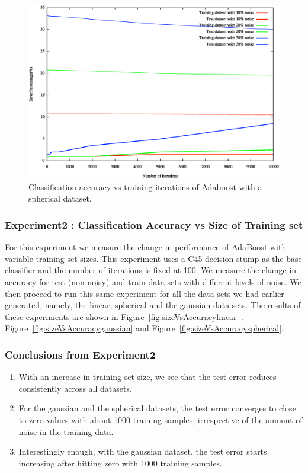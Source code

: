 \documentclass[letterpaper,11pt]{article}
\begin{document}
\begin{figure}[H]
  \centering
  \includegraphics[width=140mm]{iterVsAccuracy-spherical.eps}
  \caption{Classification accuracy vs training iterations of Adaboost with a spherical dataset.}
  \label{fig:iterVsAccuracyspherical}
\end{figure}

\subsubsection{Experiment2 : Classification Accuracy vs Size of Training set}  For this experiment we measure the change in performance of AdaBoost with variable training set sizes. This experiment uses a C45 decision stump as the base classifier and the number of iterations is fixed at 100. We measure the change in accuracy for test (non-noisy) and train data sets with different levels of noise. We then proceed to run this same experiment for all the data sets we had earlier generated, namely, the linear, spherical and the gaussian data sets. The results of these experiments are shown in Figure~\ref{fig:sizeVsAccuracylinear} , Figure~\ref{fig:sizeVsAccuracygaussian} and Figure~\ref{fig:sizeVsAccuracyspherical}.

\subsubsection{Conclusions from Experiment2}
\begin{enumerate}
\item With an increase in training set size, we see that the test error reduces consistently across all datasets. 
\item For the gaussian and the spherical datasets, the test error converges to close to zero values with about 1000 training samples, irrespective of the amount of noise in the training data.
\item Interestingly  enough, with the gaussian dataset, the test error starts increasing after hitting zero with 1000 training samples. 
\end{enumerate}
\end{document}
